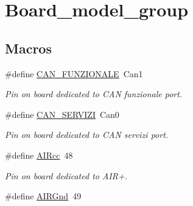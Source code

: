 \hypertarget{group___board__model__group}{\section{Board\-\_\-model\-\_\-group}
\label{group___board__model__group}
}
\subsection*{Macros}
\begin{DoxyCompactItemize}
\item 
\hypertarget{group___board__model__group_gaea8caf3e051442ba02c4e44a59602796}{\#define \hyperlink{group___board__model__group_gaea8caf3e051442ba02c4e44a59602796}{C\-A\-N\-\_\-\-F\-U\-N\-Z\-I\-O\-N\-A\-L\-E}~Can1}\label{group___board__model__group_gaea8caf3e051442ba02c4e44a59602796}

\begin{DoxyCompactList}\small\item\em Pin on board dedicated to C\-A\-N funzionale port. \end{DoxyCompactList}\item 
\hypertarget{group___board__model__group_ga8d2f70cd4c07aafe94fd9944121922d9}{\#define \hyperlink{group___board__model__group_ga8d2f70cd4c07aafe94fd9944121922d9}{C\-A\-N\-\_\-\-S\-E\-R\-V\-I\-Z\-I}~Can0}\label{group___board__model__group_ga8d2f70cd4c07aafe94fd9944121922d9}

\begin{DoxyCompactList}\small\item\em Pin on board dedicated to C\-A\-N servizi port. \end{DoxyCompactList}\item 
\hypertarget{group___board__model__group_ga15003800bba3fb64e770c6a920613419}{\#define \hyperlink{group___board__model__group_ga15003800bba3fb64e770c6a920613419}{A\-I\-Rcc}~48}\label{group___board__model__group_ga15003800bba3fb64e770c6a920613419}

\begin{DoxyCompactList}\small\item\em Pin on board dedicated to A\-I\-R+. \end{DoxyCompactList}\item 
\hypertarget{group___board__model__group_gab421578437964f5c645163739a0803e7}{\#define \hyperlink{group___board__model__group_gab421578437964f5c645163739a0803e7}{A\-I\-R\-Gnd}~49}\label{group___board__model__group_gab421578437964f5c645163739a0803e7}


\end{DoxyCompactItemize}
